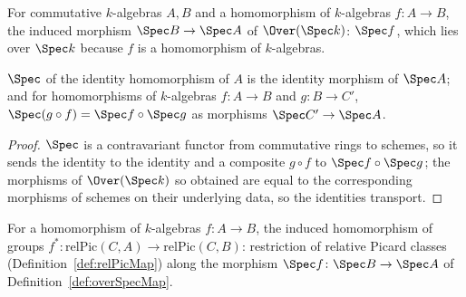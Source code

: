 \begin{definition}
  \label{def:overSpecMap}
  \leanok
  For commutative \(k\)-algebras \(A, B\) and a homomorphism of \(k\)-algebras
  \(f \colon A \to B\), the induced morphism \(\Spec B \to \Spec A\) of \(\Over(\Spec k)\):
  \(\Spec f\), which lies over \(\Spec k\) because \(f\) is a homomorphism of \(k\)-algebras.
\end{definition}

\begin{lemma}
  \label{lem:overSpecMap_functor}
  \leanok
  \(\Spec\) of the identity homomorphism of \(A\) is the identity morphism of \(\Spec A\); and
  for homomorphisms of \(k\)-algebras \(f \colon A \to B\) and \(g \colon B \to C'\),
  \(\Spec(g \circ f) = \Spec f \circ \Spec g\) as morphisms \(\Spec C' \to \Spec A\).
\end{lemma}
\begin{proof}
  \leanok
  \(\Spec\) is a contravariant functor from commutative rings to schemes, so it sends the
  identity to the identity and a composite \(g \circ f\) to \(\Spec f \circ \Spec g\); the
  morphisms of \(\Over(\Spec k)\) so obtained are equal to the corresponding morphisms of
  schemes on their underlying data, so the identities transport.
\end{proof}

\begin{definition}
  \label{def:relPicAlgMap}
  \leanok
  For a homomorphism of \(k\)-algebras \(f \colon A \to B\), the induced homomorphism of groups
  \(f^{*} \colon \mathrm{relPic}(C,A) \to \mathrm{relPic}(C,B)\): restriction of relative
  Picard classes (Definition~\ref{def:relPicMap}) along the morphism
  \(\Spec f \colon \Spec B \to \Spec A\) of Definition~\ref{def:overSpecMap}.
\end{definition}

